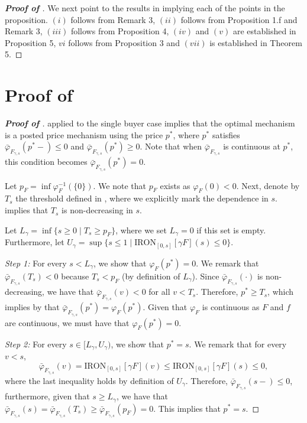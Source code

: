 \begin{proof}[\textbf{Proof of }]
We next point to the results in \cite{monteiro2010optimal} implying each of the points in the proposition.
    $(i)$ follows from Remark 3, $(ii)$ follows from Proposition 1.f and Remark 3, $(iii)$ follows from Proposition 4, $(iv)$ and $(v)$ are established in Proposition 5, $vi$ follows from Proposition 3 and $(vii)$ is established in Theorem 5.
\end{proof}

\section{Proof of }

\begin{proof}[\textbf{Proof of }]
    applied to the single buyer case implies that the optimal mechanism is a posted price mechanism using the price $p^*$, where $p^*$ satisfies $\bar{\varphi}_{F_{\gamma,s}}(p^{*}-) \leq 0$ and $\bar{\varphi}_{F_{\gamma,s}}(p^{*}) \geq 0$. Note that when $\bar{\varphi}_{F_{\gamma,s}}$ is continuous at $p^*$, this condition becomes $\bar{\varphi}_{F_{\gamma,s}}(p^*) = 0$.
   
   Let $p_F = \inf \varphi_{F}^{-1}(\{0\})$. We note that $p_F$ exists as $\varphi_{F}(0) < 0$. Next, denote by $T_{s}$ the threshold defined in , where we explicitly mark the dependence in $s$.  implies that $T_s$ is non-decreasing in $s$.

   Let $L_{\gamma} = \inf \{ s \geq 0 \mid T_s \geq p_F\}$, where we set $L_{\gamma} = 0$ if this set is empty. Furthermore, let $U_\gamma = \sup\{s \leq 1 \mid \mathrm{IRON}_{[0, s]}[\gamma F](s) \leq 0 \}$.
   
   
   \textit{Step 1:} For every $s < L_{\gamma}$, we show that $\varphi_{F}(p^*) = 0$. We remark that $\bar{\varphi}_{F_{\gamma,s}}(T_s) < 0$ because $T_s < p_F$ (by definition of $L_{\gamma}$). Since $\bar{\varphi}_{F_{\gamma,s}}(\cdot)$ is non-decreasing, we have that $\bar{\varphi}_{F_{\gamma,s}}(v) < 0$ for all $v < T_s$. Therefore, $p^* \geq T_s$, which implies by  that $\bar{\varphi}_{F_{\gamma,s}}(p^*) = \varphi_{F}(p^*)$. Given that $\varphi_{F}$ is continuous as $F$ and $f$ are continuous, we must have that $\varphi_{F}(p^*) = 0$.

   \textit{Step 2:} For every $s \in [L_{\gamma}, U_{\gamma})$, we show that $p^* = s$. We remark that for every $v < s$, 
   \begin{equation*}
       \bar{\varphi}_{F_{\gamma,s}}(v) = \mathrm{IRON}_{[0, s]}[\gamma F](v) \leq \mathrm{IRON}_{[0, s]}[\gamma F](s) \leq 0,
   \end{equation*}
   where the last inequality holds by definition of $U_{\gamma}$. Therefore, $\bar{\varphi}_{F_{\gamma,s}}(s-) \leq 0$, furthermore, given that $s \geq L_{\gamma}$, we have that
   $\bar{\varphi}_{F_{\gamma,s}}(s) = \bar{\varphi}_{F_{\gamma,s}}(T_s) \geq \bar{\varphi}_{F_{\gamma,s}}(p_F) = 0$.  This implies that $p^* = s.$


\end{proof}
